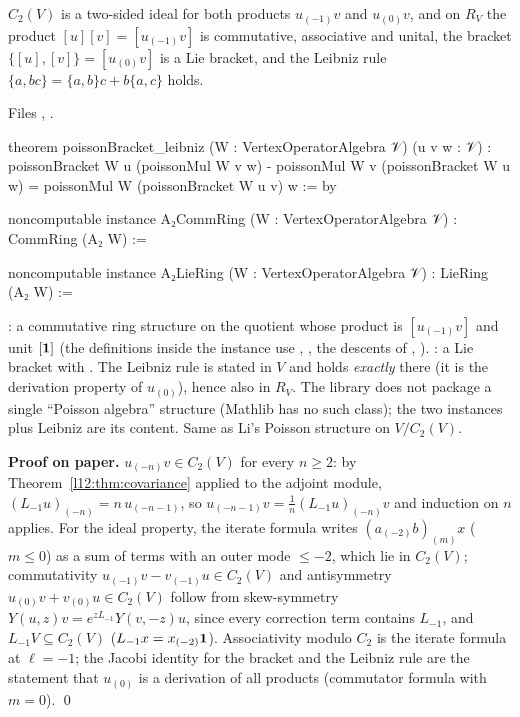 \begin{theorem}\label{l12:thm:poisson}
$C_2(V)$ is a two-sided ideal for both products $u_{(-1)}v$ and $u_{(0)}v$, and on $R_V$ the product
$[u][v] = [u_{(-1)}v]$ is commutative, associative and unital, the bracket $\{[u],[v]\} = [u_{(0)}v]$ is a Lie
bracket, and the Leibniz rule $\{a,bc\} = \{a,b\}c + b\{a,c\}$ holds.
\end{theorem}
\noindent Files ,
.
\begin{leancode}
theorem poissonBracket_leibniz (W : VertexOperatorAlgebra 𝒱) (u v w : 𝒱) :
    poissonBracket W u (poissonMul W v w) - poissonMul W v (poissonBracket W u w)
      = poissonMul W (poissonBracket W u v) w := by

noncomputable instance A₂CommRing (W : VertexOperatorAlgebra 𝒱) : CommRing (A₂ W) :=

noncomputable instance A₂LieRing (W : VertexOperatorAlgebra 𝒱) : LieRing (A₂ W) :=
\end{leancode}

\begin{dictionary}
: a commutative ring structure on the quotient whose product is $[u_{(-1)}v]$ and unit
$[\mathbf{1}]$ (the definitions inside the instance use , , the descents of
, ). : a Lie bracket with . The
Leibniz rule is stated in $V$ and holds \emph{exactly} there (it is the derivation property of $u_{(0)}$), hence
also in $R_V$. The library does not package a single ``Poisson algebra'' structure (Mathlib has no such class);
the two instances plus Leibniz are its content. Same as Li's Poisson structure on $V/C_2(V)$.
\end{dictionary}

\textbf{Proof on paper.} $u_{(-n)}v\in C_2(V)$ for every $n\ge2$: by Theorem~\ref{l12:thm:covariance} applied to the adjoint module, $(L_{-1}u)_{(-n)} = n\,u_{(-n-1)}$, so $u_{(-n-1)}v = \frac1n(L_{-1}u)_{(-n)}v$ and induction on $n$ applies. For the
ideal property, the iterate formula writes $(a_{(-2)}b)_{(m)}x$ ($m\le0$) as a sum of terms with an outer mode
$\le-2$, which lie in $C_2(V)$; commutativity $u_{(-1)}v - v_{(-1)}u\in C_2(V)$ and antisymmetry
$u_{(0)}v + v_{(0)}u\in C_2(V)$ follow from skew-symmetry $Y(u,z)v = e^{zL_{-1}}Y(v,-z)u$, since every correction
term contains $L_{-1}$, and $L_{-1}V\subseteq C_2(V)$ ($L_{-1}x = x_{(-2)}\mathbf{1}$). Associativity modulo $C_2$
is the iterate formula at $\ell = -1$; the Jacobi identity for the bracket and the Leibniz rule are the
statement that $u_{(0)}$ is a derivation of all products (commutator formula with $m = 0$). \qed

